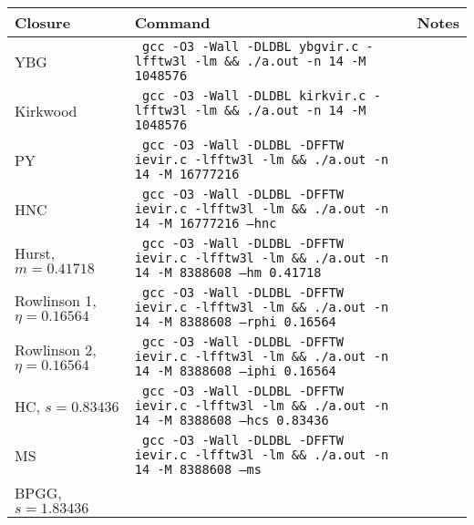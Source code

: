\documentclass[preprint]{revtex4-1}
\numberwithin{equation}{subsection}
\numberwithin{table}{section}
\begin{document}
\begin{table}\footnotesize
  \begin{tabular}{p{3cm} p{11cm} p{2cm}}
  Closure
  &
  Command
  &
  Notes \\
  \hline
  YBG
  &
  \texttt{
    gcc -O3 -Wall -DLDBL ybgvir.c -lfftw3l -lm
    \newline
    \&\& ./a.out -n 14 -M 1048576
  }
  &
  \\
  Kirkwood
  &
  \texttt{
    gcc -O3 -Wall -DLDBL kirkvir.c -lfftw3l -lm
    \newline
    \&\& ./a.out -n 14 -M 1048576
  }
  &
  \\
  PY
  &
  \texttt{
    gcc -O3 -Wall -DLDBL -DFFTW ievir.c -lfftw3l -lm
    \newline
    \&\& ./a.out -n 14 -M 16777216
  }
  &
  \\
  HNC
  &
  \texttt{
    gcc -O3 -Wall -DLDBL -DFFTW ievir.c -lfftw3l -lm
    \newline
    \&\& ./a.out -n 14 -M 16777216 --hnc
  }
  &
  \\
  Hurst, \newline
    $m = 0.41718$
  &
  \texttt{
    gcc -O3 -Wall -DLDBL -DFFTW ievir.c -lfftw3l -lm
    \newline
    \&\& ./a.out -n 14 -M 8388608 --hm 0.41718
  }
  &
  \\
  Rowlinson 1, \newline
    $\eta = 0.16564$
  &
  \texttt{
    gcc -O3 -Wall -DLDBL -DFFTW ievir.c -lfftw3l -lm
    \newline
    \&\& ./a.out -n 14 -M 8388608 --rphi 0.16564
  }
  &
  \\
  Rowlinson 2, \newline
    $\eta = 0.16564$
  &
  \texttt{
    gcc -O3 -Wall -DLDBL -DFFTW ievir.c -lfftw3l -lm
    \newline
    \&\& ./a.out -n 14 -M 8388608 --iphi 0.16564
  }
  &
  \\
  HC, \newline
    $s = 0.83436$
  &
  \texttt{
    gcc -O3 -Wall -DLDBL -DFFTW ievir.c -lfftw3l -lm
    \newline
    \&\& ./a.out -n 14 -M 8388608 --hcs 0.83436
  }
  &
  \\
  MS
  &
  \texttt{
    gcc -O3 -Wall -DLDBL -DFFTW ievir.c -lfftw3l -lm
    \newline
    \&\& ./a.out -n 14 -M 8388608 --ms
  }
  &
  \\
  BPGG, \newline
  $s = 1.83436$
  &
  \texttt{
}
\end{tabular}
\end{table}
\end{document}
